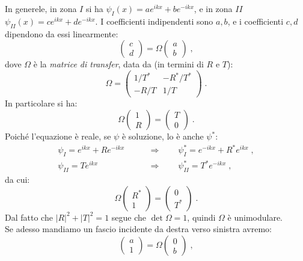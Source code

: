 \documentclass[10pt,a4paper]{report}
\theoremstyle{definition}
\numberwithin{equation}{section}
\begin{document}
In generele, in zona $I$ si ha $\psi_I(x)=ae^{ikx}+be^{-ikx}$, e in zona $II$ $\psi_{II}(x)=ce^{ikx}+de^{-ikx}$. I coefficienti indipendenti sono $a,b$, e i coefficienti $c,d$ dipendono da essi linearmente:
\begin{equation*}
\left(\begin{matrix}
c \\
d
\end{matrix}\right)=\Omega\left(
\begin{matrix}
a \\
b
\end{matrix}\right)\;,
\end{equation*}
dove $\Omega$ è la \textit{matrice di transfer}, data da (in termini di $R$ e $T$):
\begin{equation}
\Omega=\left(
\begin{matrix}
1/T^* & -R^*/T^* \\
-R/T & 1/T
\end{matrix}\right)\;.
\end{equation}
In particolare si ha:
$$
\Omega\left(
\begin{matrix}
1 \\
R
\end{matrix}\right)=\left(
\begin{matrix}
T \\
0
\end{matrix}\right)\;.
$$
Poiché l'equazione è reale, se $\psi$ è soluzione, lo è anche $\psi^*$:
\begin{align*}
\psi_I=e^{ikx}+Re^{-ikx}\qquad &\Longrightarrow \qquad \psi_I^*=e^{-ikx}+R^*e^{ikx}\;, \\
\psi_{II}=Te^{ikx} \qquad &\Longrightarrow \qquad \psi_{II}^*=T^*e^{-ikx}\;,
\end{align*}
da cui:
$$
\Omega\left(
\begin{matrix}
R^* \\
1
\end{matrix}\right)=\left(
\begin{matrix}
0 \\
T^*
\end{matrix}\right)\;.
$$
Dal fatto che $|R|^2+|T|^2=1$ segue che $\det\Omega=1$, quindi $\Omega$ è unimodulare. \\
Se adesso mandiamo un fascio incidente da destra verso sinistra avremo:
$$
\left(\begin{matrix}
a \\
1
\end{matrix}\right)=\Omega\left(
\begin{matrix}
0 \\
b
\end{matrix}\right)\;,
$$
\end{document}
